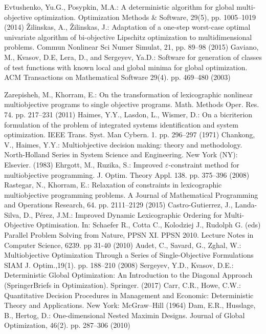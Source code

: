 \documentclass[smallextended]{svjour3}       %
\begin{document}
\begin{thebibliography}{}
 Evtushenko, Yu.G., Posypkin, M.A.: A deterministic algorithm for global multi-objective optimization. Optimization Methods \& Software, 29(5), pp. 1005--1019 (2014)
 {\v Z}ilinskas, A., {\v Z}ilinskas, J.: Adaptation of a one-step worst-case optimal univariate algorithm of bi-objective Lipschitz optimization to multidimensional problems. Commun Nonlinear Sci Numer Simulat, 21, pp. 89--98 (2015)
 Gaviano, M., Kvasov, D.E, Lera, D., and Sergeyev, Ya.D.: Software for generation of classes of test functions with known local and global minima for global optimization. ACM Transactions on Mathematical Software 29(4). pp. 469--480 (2003)


 Zarepisheh, M., Khorram, E.: On the transformation of lexicographic nonlinear multiobjective  programs to single objective programs. Math. Methods Oper. Res. 74. pp. 217--231 (2011)
 Haimes, Y.Y., Lasdon, L., Wismer, D.: On a bicriterion formulation of the problem of integrated systems identification and system optimization. IEEE Trans. Syst. Man Cybern. 1. pp. 296--297 (1971)
 Chankong, V., Haimes, Y.Y.: Multiobjective decision making: theory and methodology. North-Holland Series in System Science and Engineering. New York (NY): Elsevier. (1983)
 Ehrgott, M., Ruzika, S.: Improved $\varepsilon$-constraint method for multiobjective programming. J. Optim. Theory Appl. 138. pp. 375--396 (2008)
 Rastegar, N., Khorram, E.: Relaxation of constraints in lexicographic multiobjective programming problems. A Journal of Mathematical Programming and Operations Research, 64. pp. 2111--2129 (2015)
 Castro-Gutierrez, J., Landa-Silva, D., Pérez, J.M.: Improved Dynamic Lexicographic Ordering for Multi-Objective Optimisation. In: Schaefer R., Cotta C., Kolodziej J., Rudolph G. (eds) Parallel Problem Solving from Nature, PPSN XI. PPSN 2010. Lecture Notes in Computer Science, 6239. pp 31-40 (2010) 
 Audet, C., Savard, G., Zghal, W.: Multiobjective Optimization Through a Series of Single-Objective Formulations SIAM J. Optim.,19(1). pp. 188--210 (2008)
 Sergeyev, Y.D., Kvasov, D.E.: Deterministic Global Optimization: An Introduction to the Diagonal Approach (SpringerBriefs in Optimization). Springer. (2017)
 Carr, C.R., Howe, C.W.: Quantitative Decision Procedures in Management and Economic: Deterministic Theory and Applications. New York: McGraw–Hill (1964)
 Dam, E.R., Husslage, B., Hertog, D.: One-dimensional Nested Maximin Designs. Journal of Global Optimization, 46(2). pp. 287--306 (2010)

\end{thebibliography}
\end{document}
